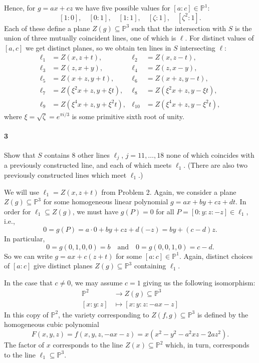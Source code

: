 \documentclass[12pt]{article}
\newlength{\myparskip}
\newenvironment{fullbox}{\begin{lrbox}{\savefullbox}\begin{minipage}{\dimexpr\textwidth-2\fboxsep\relax}\setlength{\parskip}{\myparskip}}{\end{minipage}\end{lrbox}\framebox[\textwidth]{\usebox{\savefullbox}}}
\newenvironment{pbox}[1][]{\begin{fullbox}\ifx#1\empty\else\paragraph{#1}\phantom{}\fi}{\end{fullbox}}
\theoremstyle{definition}
\newcommand{\isp}[1]{\quad\text{#1}\quad}
\renewcommand{\P}{\mathbb{P}}
\newcommand{\<}{\langle}
\renewcommand{\>}{\rangle}
\begin{document}
Hence, for $g = ax + cz$ we have five possible values for $[a : c] \in \P^1$:
\[
    [1 : 0], \quad [0 : 1], \quad [1 : 1], \quad [\zeta : 1], \quad [\zeta^2 : 1].
\]
Each of these define a plane $Z(g) \subseteq \P^3$ such that the intersection with $S$ is the union of three mutually coincident lines, one of which is $\ell$.
For distinct values of $[a, c]$ we get distinct planes, so we obtain ten lines in $S$ intersecting $\ell$:
\begin{align*}
    \ell_1 &= Z(x, z + t), & \ell_2 &= Z(x, z - t), \\
    \ell_3 &= Z(z, x + y), & \ell_4 &= Z(z, x - y), \\
    \ell_5 &= Z(x + z, y + t), & \ell_6 &= Z(x + z, y - t), \\
    \ell_7 &= Z(\xi^2 x + z, y + \xi t), & \ell_8 &= Z(\xi^2 x + z, y - \xi t), \\
    \ell_9 &= Z(\xi^4 x + z, y + \xi^2 t), & \ell_{10} &= Z(\xi^4 x + z, y - \xi^2 t),
\end{align*}
where $\xi = \sqrt{\zeta} = e^{\pi i /3}$ is some primitive sixth root of unity.





\newpage
\begin{pbox}[3]
    Show that $S$ contains $8$ other lines $\ell_j$, $j = 11, \dots, 18$ none of which coincides with a previously constructed line, and each of which meets $\ell_1$.
    (There are also two previously constructed lines which meet $\ell_1$.)
\end{pbox}

We will use $\ell_1 = Z(x, z + t)$ from Problem 2.
Again, we consider a plane $Z(g) \subseteq \P^3$ for some homogeneous linear polynomial $g = ax + by + cz + dt$.
In order for $\ell_1 \subseteq Z(g)$, we must have $g(P) = 0$ for all $P = [0 : y : z : -z] \in \ell_1$, i.e.,
\[
    0 = g(P) = a \cdot 0 + by + cz + d(-z) = by + (c - d)z.
\]
In particular,
\[
    0 = g(0, 1, 0, 0) = b
    \isp{and}
    0 = g(0, 0, 1, 0) = c - d.
\]
So we can write $g = ax + c(z + t)$ for some $[a : c] \in \P^1$.
Again, distinct choices of $[a : c]$ give distinct planes $Z(g) \subseteq \P^3$ containing $\ell_1$.

In the case that $c \ne 0$, we may assume $c = 1$ giving us the following isomorphism:
\begin{align*}
    \P^2 &\longrightarrow Z(g) \subseteq \P^3 \\
    [x : y : z] &\longmapsto [x : y : z : -ax - z]
\end{align*}
In this copy of $\P^2$, the variety corresponding to $Z(f, g) \subseteq \P^3$ is defined by the homogeneous cubic polynomial
\[
    F(x, y, z)
        = f(x, y, z, -ax - z)
        = x(x^2 - y^2 - a^2xz - 2az^2).
\]
The factor of $x$ corresponds to the line $Z(x) \subseteq \P^2$ which, in turn, corresponds to the line $\ell_1 \subseteq \P^3$.
\end{document}
